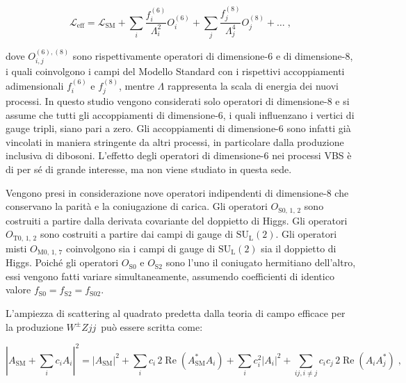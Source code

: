 \documentclass[11pt]{article}
\newcommand{\wzjj}{$W^\pm Z jj$}
\begin{document}
\begin{equation} \label{eq:EFT_Lagrangian}
\mathcal{L}_{\mathrm{eff}} = \mathcal{L}_{\mathrm{SM}}+\sum_i \frac{f_i^{(6)}}{\Lambda_i^2} O_i^{(6)}+\sum_j \frac{f_j^{(8)}}{\Lambda_j^4} O_j^{(8)}+\ldots \; ,
\end{equation}

dove $O_{i,j}^{(6),(8)}$ sono rispettivamente operatori di dimensione-6 e di dimensione-8, i quali coinvolgono i campi del Modello Standard con i rispettivi accoppiamenti adimensionali $f_i^{(6)}$ e $f_j^{(8)}$, mentre $\Lambda$ rappresenta la scala di energia dei nuovi processi. In questo studio vengono considerati solo operatori di dimensione-8 e si assume che tutti gli accoppiamenti di dimensione-6, i quali influenzano i vertici di gauge tripli, siano pari a zero. Gli accoppiamenti di dimensione-6 sono infatti già vincolati in maniera stringente da altri processi, in particolare dalla produzione inclusiva di dibosoni. L'effetto degli operatori di dimensione-6 nei processi VBS è di per sé di grande interesse, ma non viene studiato in questa sede. 

Vengono presi in considerazione nove operatori indipendenti di dimensione-8 che conservano la parità e la coniugazione di carica. Gli operatori $O_{\mathrm{S}0,\, 1,\, 2}$ sono costruiti a partire dalla derivata covariante del doppietto di Higgs. Gli operatori $O_{\mathrm{T}0,\, 1,\, 2}$ sono costruiti a partire dai campi di gauge di $\mathrm{SU}_{\mathrm{L}}(2)$. Gli operatori misti $O_{\mathrm{M}0,\, 1,\, 7}$ coinvolgono sia i campi di gauge di $\mathrm{SU}_{\mathrm{L}}(2)$ sia il doppietto di Higgs. Poiché gli operatori $O_{\mathrm{S}0}$ e $O_{\mathrm{S}2}$ sono l'uno il coniugato hermitiano dell'altro, essi vengono fatti variare simultaneamente, assumendo coefficienti di identico valore $f_{\mathrm{S}0} = f_{\mathrm{S}2} = f_{\mathrm{S}02}$.

L'ampiezza di scattering al quadrato predetta dalla teoria di campo efficace per la produzione \wzjj\ può essere scritta come:

\begin{equation}
\left| A_{\mathrm{SM}}+\sum_i c_i A_i \right|^2 = {\left| A_{\mathrm{SM}} \right| }^2 + \sum_i c_i \, 2 \operatorname{Re}(A^*_{\mathrm{SM}}A_i)+ \sum_i c_i^2 |A_i|^2 +\sum_{ij,i\neq j} c_i c_j \, 2 \operatorname{Re}(A_{i} A^*_{j}) \; ,
\label{eq:EFT}
\end{equation}
\end{document}

